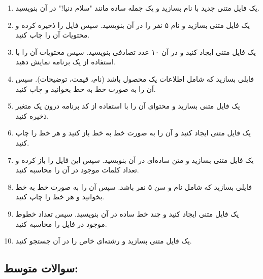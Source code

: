 \documentclass[b5paper,12pt]{article}
\begin{document}
	\begin{enumerate}
		\item یک فایل متنی جدید با نام  بسازید و یک جمله ساده مانند "سلام دنیا!" در آن بنویسید.
		\item یک فایل متنی بسازید و نام ۵ نفر را در آن بنویسید. سپس فایل را ذخیره کرده و محتویات آن را چاپ کنید.
		\item یک فایل متنی ایجاد کنید و در آن ۱۰ عدد تصادفی بنویسید. سپس محتویات آن را با استفاده از یک برنامه نمایش دهید.
		\item فایلی بسازید که شامل اطلاعات یک محصول باشد (نام، قیمت، توضیحات). سپس آن را به صورت خط به خط بخوانید و چاپ کنید.
		\item یک فایل متنی بسازید و محتوای آن را با استفاده از کد برنامه درون یک متغیر ذخیره کنید.
		\item یک فایل متنی ایجاد کنید و آن را به صورت خط به خط باز کنید و هر خط را چاپ کنید.
		\item یک فایل متنی بسازید و متن ساده‌ای در آن بنویسید. سپس این فایل را باز کرده و تعداد کلمات موجود در آن را محاسبه کنید.
		\item فایلی بسازید که شامل نام و سن ۵ نفر باشد. سپس آن را به صورت خط به خط بخوانید و هر خط را چاپ کنید.
		\item یک فایل متنی ایجاد کنید و چند خط ساده در آن بنویسید. سپس تعداد خطوط موجود در فایل را محاسبه کنید.
		\item یک فایل متنی بسازید و رشته‌ای خاص را در آن جستجو کنید.
	\end{enumerate}
	
	\subsection*{سوالات متوسط:}
	
\end{document}
